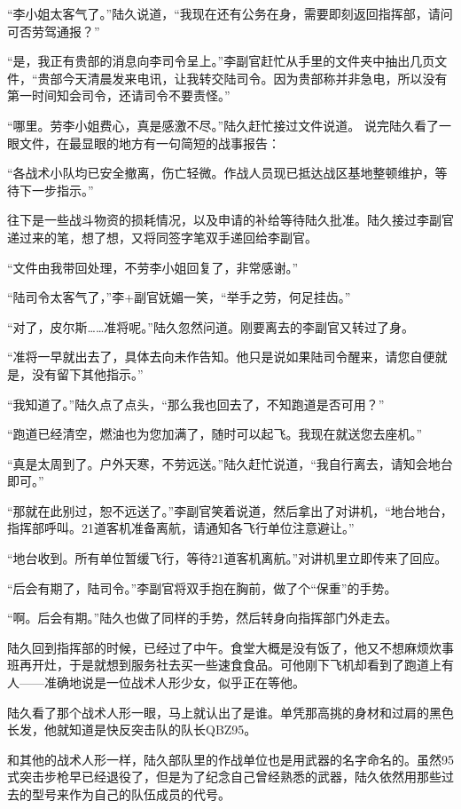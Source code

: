 “李小姐太客气了。”陆久说道，“我现在还有公务在身，需要即刻返回指挥部，请问可否劳驾通报？”

“是，我正有贵部的消息向李司令呈上。”李副官赶忙从手里的文件夹中抽出几页文件，“贵部今天清晨发来电讯，让我转交陆司令。因为贵部称并非急电，所以没有第一时间知会司令，还请司令不要责怪。”

“哪里。劳李小姐费心，真是感激不尽。”陆久赶忙接过文件说道。
说完陆久看了一眼文件，在最显眼的地方有一句简短的战事报告：

“各战术小队均已安全撤离，伤亡轻微。作战人员现已抵达战区基地整顿维护，等待下一步指示。”

往下是一些战斗物资的损耗情况，以及申请的补给等待陆久批准。陆久接过李副官递过来的笔，想了想，又将同签字笔双手递回给李副官。

“文件由我带回处理，不劳李小姐回复了，非常感谢。”

“陆司令太客气了，”李+副官妩媚一笑，“举手之劳，何足挂齿。”

“对了，皮尔斯……准将呢。”陆久忽然问道。刚要离去的李副官又转过了身。

“准将一早就出去了，具体去向未作告知。他只是说如果陆司令醒来，请您自便就是，没有留下其他指示。”

“我知道了。”陆久点了点头，“那么我也回去了，不知跑道是否可用？”

“跑道已经清空，燃油也为您加满了，随时可以起飞。我现在就送您去座机。”

“真是太周到了。户外天寒，不劳远送。”陆久赶忙说道，“我自行离去，请知会地台即可。”

“那就在此别过，恕不远送了。”李副官笑着说道，然后拿出了对讲机，“地台地台，指挥部呼叫。21道客机准备离航，请通知各飞行单位注意避让。”

“地台收到。所有单位暂缓飞行，等待21道客机离航。”对讲机里立即传来了回应。

“后会有期了，陆司令。”李副官将双手抱在胸前，做了个“保重”的手势。

“啊。后会有期。”陆久也做了同样的手势，然后转身向指挥部门外走去。

陆久回到指挥部的时候，已经过了中午。食堂大概是没有饭了，他又不想麻烦炊事班再开灶，于是就想到服务社去买一些速食食品。可他刚下飞机却看到了跑道上有人——准确地说是一位战术人形少女，似乎正在等他。

陆久看了那个战术人形一眼，马上就认出了是谁。单凭那高挑的身材和过肩的黑色长发，他就知道是快反突击队的队长QBZ95。

和其他的战术人形一样，陆久部队里的作战单位也是用武器的名字命名的。虽然95式突击步枪早已经退役了，但是为了纪念自己曾经熟悉的武器，陆久依然用那些过去的型号来作为自己的队伍成员的代号。

